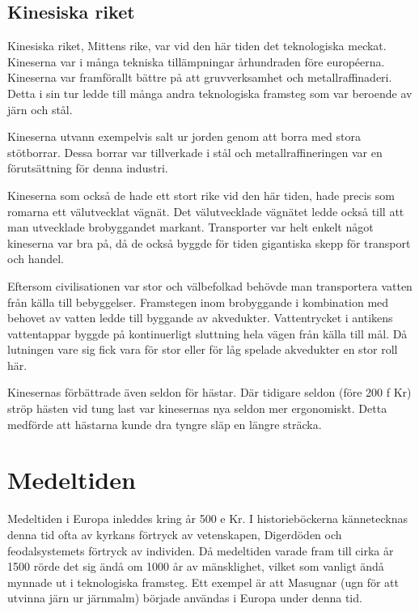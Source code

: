 \documentclass[a4paper,12pt,fleqn]{article}
\begin{document}
\subsection{Kinesiska riket}

Kinesiska riket, Mittens rike, var vid den här tiden det teknologiska meckat. Kineserna var i många tekniska tillämpningar århundraden före européerna. Kineserna var framförallt bättre på att gruvverksamhet och metallraffinaderi. Detta i sin tur ledde till många andra teknologiska framsteg som var beroende av järn och stål. 

Kineserna utvann exempelvis salt ur jorden genom att borra med stora stötborrar. Dessa borrar var tillverkade i stål och metallraffineringen var en förutsättning för denna industri. 

Kineserna som också de hade ett stort rike vid den här tiden, hade precis som romarna ett välutvecklat vägnät. Det välutvecklade vägnätet ledde också till att man utvecklade brobyggandet markant. Transporter var helt enkelt något kineserna var bra på, då de också byggde för tiden gigantiska skepp för transport och handel. 

Eftersom civilisationen var stor och välbefolkad behövde man transportera vatten från källa till bebyggelser. Framstegen inom brobyggande i kombination med behovet av vatten ledde till byggande av akvedukter. Vattentrycket i antikens vattentappar byggde på kontinuerligt sluttning hela vägen från källa till mål. Då lutningen vare sig fick vara för stor eller för låg spelade akvedukter en stor roll här. 

Kinesernas förbättrade även seldon för hästar. Där tidigare seldon (före 200 f Kr) ströp hästen vid tung last var kinesernas nya seldon mer ergonomiskt. Detta medförde att hästarna kunde dra tyngre släp en längre sträcka. 

\newpage
\section{Medeltiden}

Medeltiden i Europa inleddes kring år 500 e Kr. I historieböckerna kännetecknas denna tid ofta av kyrkans förtryck av vetenskapen, Digerdöden och feodalsystemets förtryck av individen. Då medeltiden varade fram till cirka år 1500 rörde det sig ändå om 1000 år av mänsklighet, vilket som vanligt ändå mynnade ut i teknologiska framsteg. Ett exempel är att Masugnar (ugn för att utvinna järn ur järnmalm) började användas i Europa under denna tid.
\end{document}
